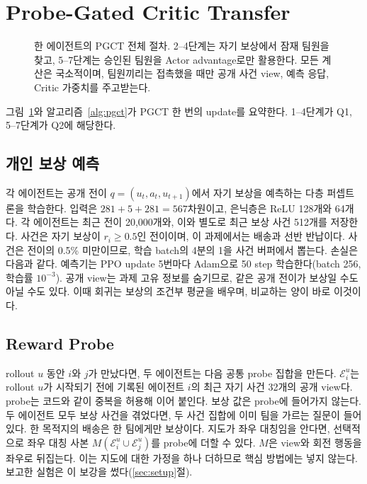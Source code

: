 \documentclass[10pt,twocolumn,letterpaper]{article}
\begin{document}
\section{Probe-Gated Critic Transfer}
\begin{figure}[t]
\centering\resizebox{.97\textwidth}{!}{}
\caption{한 에이전트의 PGCT 전체 절차. 2--4단계는 자기 보상에서 잠재 팀원을 찾고, 5--7단계는 승인된 팀원을 Actor advantage로만 활용한다. 모든 계산은 국소적이며, 팀원끼리는 접촉했을 때만 공개 사건 view, 예측 응답, Critic 가중치를 주고받는다.}\label{fig:architecture}
\end{figure}

그림~\ref{fig:architecture}와 알고리즘~\ref{alg:pgct}가 PGCT 한 번의 update를 요약한다. 1--4단계가 Q1, 5--7단계가 Q2에 해당한다.

\subsection{개인 보상 예측}
각 에이전트는 공개 전이 $q=(u_t,a_t,u_{t+1})$에서 자기 보상을 예측하는 다층 퍼셉트론을 학습한다.
\ModelEquation
입력은 $281+5+281=567$차원이고, 은닉층은 ReLU 128개와 64개다. 각 에이전트는 최근 전이 20{,}000개와, 이와 별도로 최근 보상 사건 512개를 저장한다. 사건은 자기 보상이 $r_i\ge0.5$인 전이이며, 이 과제에서는 배송과 선반 반납이다. 사건은 전이의 0.5\% 미만이므로, 학습 batch의 4분의 1을 사건 버퍼에서 뽑는다. 손실은 다음과 같다.
\RewardLossEquation
예측기는 PPO update 5번마다 Adam으로 50 step 학습한다(batch 256, 학습률 $10^{-3}$). 공개 view는 과제 고유 정보를 숨기므로, 같은 공개 전이가 보상일 수도 아닐 수도 있다. 이때 회귀는 보상의 조건부 평균을 배우며, 비교하는 양이 바로 이것이다.

\subsection{Reward Probe}
rollout $u$ 동안 $i$와 $j$가 만났다면, 두 에이전트는 다음 공통 probe 집합을 만든다.
\ProbeEquation
$\mathcal E_i^u$는 rollout $u$가 시작되기 전에 기록된 에이전트 $i$의 최근 자기 사건 32개의 공개 view다. probe는 코드와 같이 중복을 허용해 이어 붙인다. 보상 값은 probe에 들어가지 않는다. 두 에이전트 모두 보상 사건을 겪었다면, 두 사건 집합에 이미 팀을 가르는 질문이 들어 있다. 한 목적지의 배송은 한 팀에게만 보상이다. 지도가 좌우 대칭임을 안다면, 선택적으로 좌우 대칭 사본 $M(\mathcal E_i^u\cup\mathcal E_j^u)$를 probe에 더할 수 있다. $M$은 view와 회전 행동을 좌우로 뒤집는다. 이는 지도에 대한 가정을 하나 더하므로 핵심 방법에는 넣지 않는다. 보고한 실험은 이 보강을 썼다(\ref{sec:setup}절).
\end{document}
